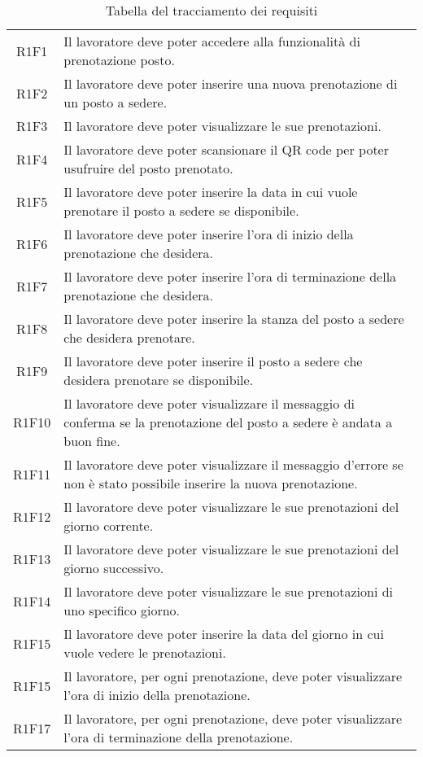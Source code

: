 \begin{table}[h]%
	\centering
	\begin{tabularx}{\textwidth}{c X}
		\hline	
		\rowcolor{giallo}
		\intest{Codice} &  \intest{Descrizione} \\	
		\hline			
		R1F1 & Il lavoratore deve poter accedere alla funzionalità di prenotazione posto.\\
		R1F2 & Il lavoratore deve poter inserire una nuova prenotazione di un posto a sedere.\\
		R1F3 & Il lavoratore deve poter visualizzare le sue prenotazioni.\\
		R1F4 & Il lavoratore deve poter scansionare il QR code per poter usufruire del posto prenotato.\\
		R1F5 & Il lavoratore deve poter inserire la data in cui vuole prenotare il posto a sedere se disponibile.\\
		R1F6 & Il lavoratore deve poter inserire l'ora di inizio della prenotazione che desidera.\\
		R1F7 & Il lavoratore deve poter inserire l'ora di terminazione della prenotazione che desidera.\\
		R1F8 & Il lavoratore deve poter inserire la stanza del posto a sedere che desidera prenotare.\\
		R1F9 & Il lavoratore deve poter inserire il posto a sedere che desidera prenotare se disponibile.\\
		R1F10 & Il lavoratore deve poter visualizzare il messaggio di conferma se la prenotazione del posto a sedere è andata a buon fine.\\
		R1F11 & Il lavoratore deve poter visualizzare il messaggio d'errore se non è stato possibile inserire la nuova prenotazione.\\
		R1F12 & Il lavoratore deve poter visualizzare le sue prenotazioni del giorno corrente.\\
		R1F13 & Il lavoratore deve poter visualizzare le sue prenotazioni del giorno successivo.\\
		R1F14 & Il lavoratore deve poter visualizzare le sue prenotazioni di uno specifico giorno.\\
		R1F15 & Il lavoratore deve poter inserire la data del giorno in cui vuole vedere le prenotazioni.\\
		R1F15 & Il lavoratore, per ogni prenotazione, deve poter visualizzare l'ora di inizio della prenotazione.\\
		R1F17 & Il lavoratore, per ogni prenotazione, deve poter visualizzare l'ora di terminazione della prenotazione.\\	
		\hline	
	\end{tabularx} \hbox{}
	\caption{Tabella del tracciamento dei requisiti}
\end{table}%
\\

